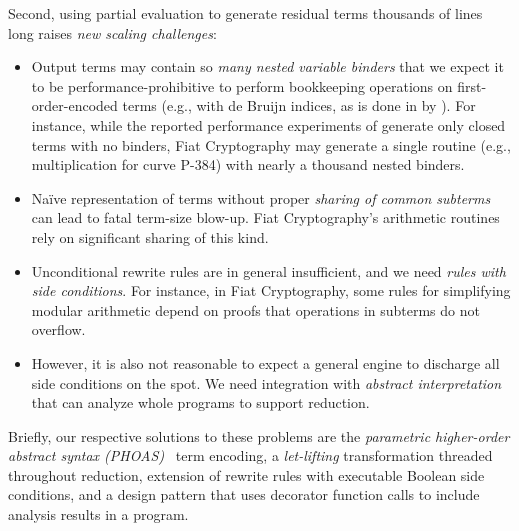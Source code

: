 Second, using partial evaluation to generate residual terms thousands of lines long raises \emph{new scaling challenges}:
\begin{itemize}
\item
  Output terms may contain so \emph{many nested variable binders} that we expect it to be performance-prohibitive to perform bookkeeping operations on first-order-encoded terms (e.g., with de Bruijn indices, as is done in \Rtac{} by \textcite{rtac}).
  For instance, while the reported performance experiments of \textcite{Aehlig} generate only closed terms with no binders, Fiat Cryptography may generate a single routine (e.g., multiplication for curve P-384) with nearly a thousand nested binders.
\item
  Naïve representation of terms without proper \emph{sharing of common subterms} can lead to fatal term-size blow-up.
  Fiat Cryptography's arithmetic routines rely on significant sharing of this kind.
\item
  Unconditional rewrite rules are in general insufficient, and we need \emph{rules with side conditions}.
  For instance, in Fiat Cryptography, some rules for simplifying modular arithmetic depend on proofs that operations in subterms do not overflow.
\item
  However, it is also not reasonable to expect a general engine to discharge all side conditions on the spot.
  We need integration with \emph{abstract interpretation} that can analyze whole programs to support reduction.
\end{itemize}

Briefly, our respective solutions to these problems are the \emph{parametric higher-order abstract syntax (PHOAS)}~\cite{PhoasICFP08} term encoding, a \emph{let-lifting} transformation threaded throughout reduction, extension of rewrite rules with executable Boolean side conditions, and a design pattern that uses decorator function calls to include analysis results in a program.

